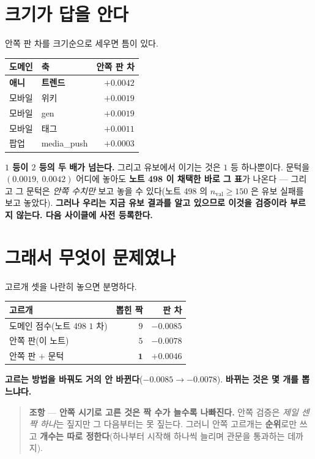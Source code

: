 \documentclass[11pt]{article}
\begin{document}
\section{크기가 답을 안다}

안쪽 판 차를 크기순으로 세우면 틈이 있다.

\begin{center}
\begin{tabular}{llr}
\hline
도메인 & 축 & 안쪽 판 차 \\
\hline
\textbf{애니} & \textbf{트렌드} & $\mathbf{+0.0042}$ \\
모바일 & 위키 & $+0.0019$ \\
모바일 & gen & $+0.0019$ \\
모바일 & 태그 & $+0.0011$ \\
팝업 & media\_push & $+0.0003$ \\
\hline
\end{tabular}
\end{center}

\textbf{$1$ 등이 $2$ 등의 두 배가 넘는다.} 그리고 유보에서 이기는 것은
$1$ 등 하나뿐이다. 문턱을 $(0.0019,\ 0.0042)$ 어디에 놓아도 \textbf{노트
498 이 채택한 바로 그 표}가 나온다 --- 그리고 그 문턱은 \emph{안쪽
수치만} 보고 놓을 수 있다(노트 498 의 $n_{\text{val}} \geq 150$ 은 유보
실패를 보고 놓았다). \textbf{그러나 우리는 지금 유보 결과를 알고 있으므로
이것을 검증이라 부르지 않는다. 다음 사이클에 사전 등록한다.}

\section{그래서 무엇이 문제였나}

고르개 셋을 나란히 놓으면 분명하다.

\begin{center}
\begin{tabular}{lrr}
\hline
고르개 & 뽑힌 짝 & 판 차 \\
\hline
도메인 점수(노트 498 $1$ 차) & $9$ & $-0.0085$ \\
안쪽 판(이 노트) & $5$ & $-0.0078$ \\
안쪽 판 $+$ 문턱 & $\mathbf{1}$ & $\mathbf{+0.0046}$ \\
\hline
\end{tabular}
\end{center}

\textbf{고르는 방법을 바꿔도 거의 안 바뀐다}($-0.0085 \to -0.0078$).
\textbf{바뀌는 것은 몇 개를 뽑느냐다.}

\begin{quote}
\textbf{조항} --- \textbf{안쪽 시기로 고른 것은 짝 수가 늘수록 나빠진다.}
안쪽 검증은 \emph{제일 센 짝 하나}는 짚지만 그 다음부터는 못 짚는다.
그러니 안쪽 고르개는 \textbf{순위}로만 쓰고 \textbf{개수는 따로
정한다}(하나부터 시작해 하나씩 늘리며 관문을 통과하는 데까지).
\end{quote}
\end{document}
